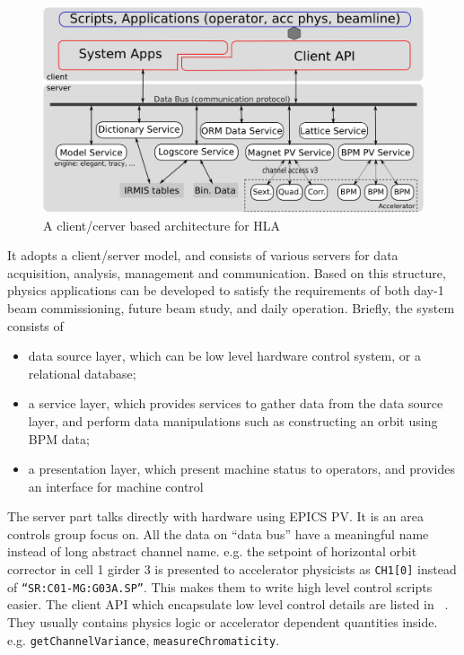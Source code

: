 \documentclass[letterpaper,showtrims]{memoir}
\newcommand{\code}[1]{\texttt{#1}}
\begin{document}
\begin{figure}
  \includegraphics[width=\textwidth]{hla_arch}
  \caption{A client/cerver based architecture for HLA}
\end{figure}

It adopts a client/server model, and consists of various servers for data
acquisition, analysis, management and communication. Based on this
structure, physics applications can be developed to satisfy the
requirements of both day-1 beam commissioning, future beam study, and
daily operation.  Briefly, the system consists of
\begin{itemize}
\item data source layer, which can be low level hardware control system,
  or a relational database;
\item a service layer, which provides services to gather data from the
  data source layer, and perform data manipulations such as constructing
  an orbit using BPM data;
\item a presentation layer, which present machine status to operators, and
  provides an interface for machine control
\end{itemize}

The server part talks directly with hardware using EPICS PV. It is an area
controls group focus on. All the data on ``data bus'' have a meaningful
name instead of long abstract channel name. e.g. the setpoint of
horizontal orbit corrector in cell 1 girder 3 is presented to accelerator
physicists as \code{CH1[0]} instead of \code{``SR:C01-MG:G03A.SP''}. This
makes them to write high level control scripts easier. The client API
which encapsulate low level control details are listed in
~\cite{shen_hla_apis}. They usually contains physics logic or accelerator
dependent quantities inside. e.g. \code{getChannelVariance},
\code{measureChromaticity}.
\end{document}
